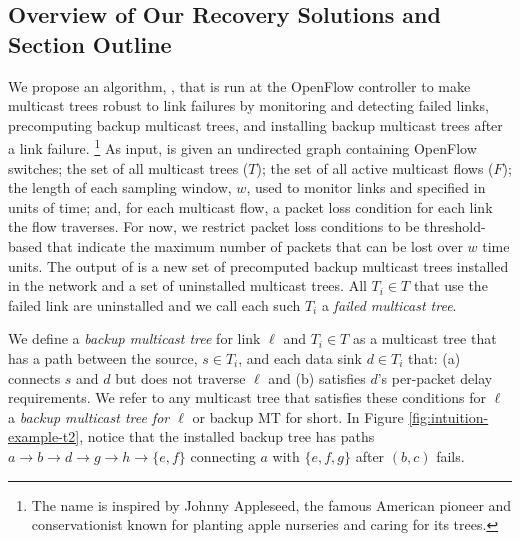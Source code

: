 

\subsection{Overview of Our Recovery Solutions and Section Outline}
\label{subsec:mdr}

We propose an algorithm, \mdrs, that is run at the OpenFlow controller to make multicast trees robust to link failures by monitoring and detecting failed links, precomputing backup multicast trees, and installing backup multicast trees after a link failure.
\footnote{The name \mdr is inspired by Johnny Appleseed, the famous American pioneer and conservationist known for planting apple nurseries and caring for its trees. }
As input, \mdr is given an undirected graph containing OpenFlow switches; the set of all multicast trees ($T$); the set of all active multicast flows ($F$); the length of each sampling window, 
$w$, used to monitor links and specified in units of time; and, for each multicast flow, a packet loss condition for each link the flow traverses. For now, we restrict packet loss conditions 
to be threshold-based that indicate the maximum number of packets that can be lost over $w$ time units. 
The output of \mdr is a new set of precomputed backup multicast trees installed in the network and a set of uninstalled multicast trees.   All $T_i \in T$ that use the failed link are uninstalled and we call each such $T_i$ a \emph{failed multicast tree}.

We define a \emph{backup multicast tree} for link $\ell$ and $T_i \in T$ as a multicast tree that has 
a path between the source, $s \in T_i$, and each data sink $d \in T_i$ that: (a) connects $s$ and $d$ but does not traverse $\ell$ and 
(b) satisfies $d$'s per-packet delay requirements.  We refer to any multicast tree that satisfies these conditions for $\ell$ a \emph{backup multicast tree for $\ell$} or backup MT for short.
In Figure \ref{fig:intuition-example-t2}, notice that the installed backup tree has paths $a \rightarrow b \rightarrow d \rightarrow g \rightarrow h \rightarrow \{e,f\}$ connecting $a$ with $\{e,f,g\}$ after $(b,c)$ fails.




